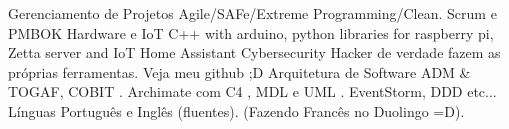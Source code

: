 \begin{cvskills}
 \cvskill
    {Gerenciamento de Projetos} %
    {Agile/SAFe/Extreme Programming/Clean. Scrum e PMBOK} %
 \cvskill
    {Hardware e IoT} %
    { C++ with arduino, python libraries for raspberry pi, Zetta server and IoT Home Assistant} %
\cvskill
{Cybersecurity} %
{ Hacker de verdade fazem as próprias ferramentas. Veja meu github ;D} %
\cvskill
{Arquitetura de Software} %
{ ADM \& TOGAF, COBIT . Archimate com C4 , MDL e UML . EventStorm, DDD etc... } %
 \cvskill
 {Línguas} %
 { Português e Inglês (fluentes). (Fazendo Francês no Duolingo =D).} %

\end{cvskills}
